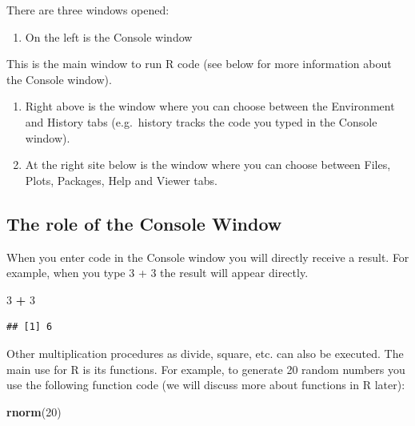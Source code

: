 \documentclass[]{book}
\newenvironment{Shaded}{\begin{snugshade}}{\end{snugshade}}
\newcommand{\KeywordTok}[1]{\textcolor[rgb]{0.13,0.29,0.53}{\textbf{#1}}}
\newcommand{\DecValTok}[1]{\textcolor[rgb]{0.00,0.00,0.81}{#1}}
\newcommand{\StringTok}[1]{\textcolor[rgb]{0.31,0.60,0.02}{#1}}
\newcommand{\OperatorTok}[1]{\textcolor[rgb]{0.81,0.36,0.00}{\textbf{#1}}}
\newcommand{\NormalTok}[1]{#1}
\providecommand{\tightlist}{%
  \setlength{\itemsep}{0pt}\setlength{\parskip}{0pt}}
\begin{document}
There are three windows opened:

\begin{enumerate}
\def\labelenumi{\arabic{enumi}.}
\tightlist
\item
  On the left is the Console window
\end{enumerate}

This is the main window to run R code (see below for more information
about the Console window).

\begin{enumerate}
\def\labelenumi{\arabic{enumi}.}
\setcounter{enumi}{1}
\item
  Right above is the window where you can choose between the Environment
  and History tabs (e.g.~history tracks the code you typed in the
  Console window).
\item
  At the right site below is the window where you can choose between
  Files, Plots, Packages, Help and Viewer tabs.
\end{enumerate}

\subsection{The role of the Console
Window}\label{the-role-of-the-console-window}

When you enter code in the Console window you will directly receive a
result. For example, when you type 3 + 3 the result will appear
directly.

\begin{Shaded}
\begin{Highlighting}[]
\DecValTok{3} \OperatorTok{+}\StringTok{ }\DecValTok{3}
\end{Highlighting}
\end{Shaded}

\begin{verbatim}
## [1] 6
\end{verbatim}

Other multiplication procedures as divide, square, etc. can also be
executed. The main use for R is its functions. For example, to generate
20 random numbers you use the following function code (we will discuss
more about functions in R later):

\begin{Shaded}
\begin{Highlighting}[]
\KeywordTok{rnorm}\NormalTok{(}\DecValTok{20}\NormalTok{)}
\end{Highlighting}
\end{Shaded}
\end{document}
